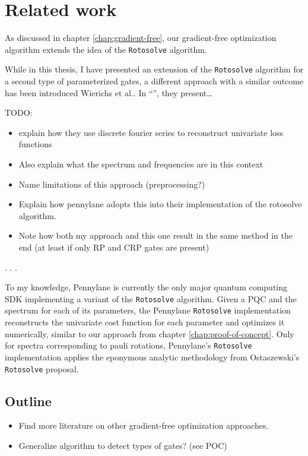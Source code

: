 \chapter{Related work}
\label{chap:related-work}

As discussed in chapter \ref{chap:gradient-free}, our gradient-free optimization
algorithm extends the idea of the \texttt{Rotosolve}
\cite{ostaszewski_structure_2021} algorithm.

While in this thesis, I have presented an extension of the \texttt{Rotosolve}
algorithm for a second type of parameterized gates, a different approach with a
similar outcome has been introduced Wierichs et al..
In ``\emph{}'', they present\dots

TODO:
\begin{itemize}
    \item explain how they use discrete fourier series to reconstruct univariate
        loss functions
    \item Also explain what the spectrum and frequencies are in this context
    \item Name limitations of this approach (preprocessing?)
    \item Explain how pennylane adopts this into their implementation of the
        rotosolve algorithm.
    \item Note how both my approach and this one result in the same method in
        the end (at least if only RP and CRP gates are present)
\end{itemize}. . . 

To my knowledge, Pennylane \cite{bergholm_pennylane_2022} is currently the only
major quantum computing SDK implementing a variant of the \texttt{Rotosolve}
\cite{ostaszewski_structure_2021} algorithm.
Given a PQC and the spectrum for each of its parameters, the Pennylane
\texttt{Rotosolve} implementation reconstructs the univariate cost function for
each parameter and optimizes it numerically, similar to our approach from
chapter \ref{chap:proof-of-concept}.
Only for spectra corresponding to pauli rotations, Pennylane's
\texttt{Rotosolve} implementation applies the eponymous analytic methodology
from Ostaszewski's \texttt{Rotosolve} proposal.

\section{Outline}
\begin{itemize}
    \item
        Find more literature on other gradient-free optimization
        approaches.
    \item Generalize algorithm to detect types of gates? (see POC)
\end{itemize}